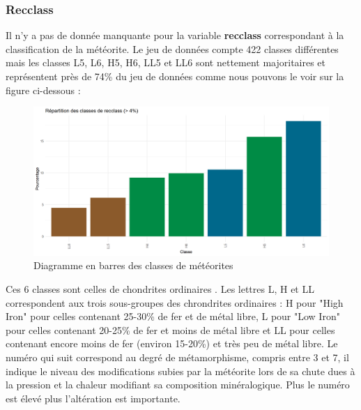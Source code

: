 \documentclass[12pt]{article}
\begin{document}
\subsubsection*{Recclass}
Il n'y a pas de donnée manquante pour la variable \textbf{recclass} correspondant à la classification de la météorite. Le jeu de données compte 422 classes différentes mais les classes L5, L6, H5, H6, LL5 et LL6 sont nettement majoritaires et représentent près de 74\% du jeu de données comme nous pouvons le voir sur la figure ci-dessous :
\begin{figure}[H]
\centering
\includegraphics[width=15.5cm]{Images/exploration/recclass_piechart_class.png}
\caption{Diagramme en barres des classes de météorites}
\end{figure}
Ces 6 classes sont celles de chondrites ordinaires \cite{Classification_meteorites}. Les lettres L, H et LL correspondent aux trois sous-groupes des chrondrites ordinaires : H pour "High Iron" pour celles contenant 25-30\% de fer et de métal libre, L pour "Low Iron" pour celles contenant 20-25\% de fer et moins de métal libre et LL pour celles contenant encore moins de fer (environ 15-20\%) et très peu de métal libre. Le numéro qui suit correspond au degré de métamorphisme, compris entre 3 et 7, il indique le niveau des modifications subies par la météorite lors de sa chute dues à la pression et la chaleur modifiant sa composition minéralogique. Plus le numéro est élevé plus l'altération est importante.
\end{document}
